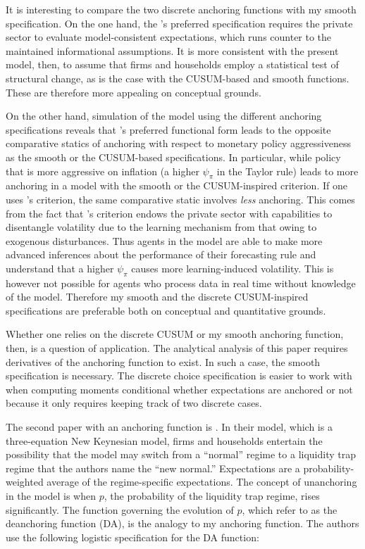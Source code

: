 \documentclass[11pt]{article}
\renewcommand{\[}{\begin{equation}}
\renewcommand{\]}{\end{equation}}
\begin{document}
It is interesting to compare the two discrete anchoring functions with my smooth specification. On the one hand, the \cite{carvalho2019anchored}'s preferred specification requires the private sector to evaluate model-consistent expectations, which runs counter to the maintained informational assumptions. It is more consistent with the present model, then, to assume that firms and households employ a statistical test of structural change, as is the case with the CUSUM-based and smooth functions. These are therefore more appealing on conceptual grounds.

On the other hand, simulation of the model using the different anchoring specifications reveals that \cite{carvalho2019anchored}'s preferred functional form leads to the opposite comparative statics of anchoring with respect to monetary policy aggressiveness as the smooth or the CUSUM-based specifications. In particular, while policy that is more aggressive on inflation (a higher $\psi_{\pi}$ in the Taylor rule) leads to more anchoring in a model with the smooth or the CUSUM-inspired criterion. If one uses \cite{carvalho2019anchored}'s criterion, the same comparative static involves \emph{less} anchoring. This comes from the fact that \cite{carvalho2019anchored}'s criterion endows the private sector with capabilities to disentangle volatility due to the learning mechanism from that owing to exogenous disturbances. Thus agents in the \cite{carvalho2019anchored} model are able to make more advanced inferences about the performance of their forecasting rule and understand that a higher $\psi_{\pi}$ causes more learning-induced volatility. This is however not possible for agents who process data in real time without knowledge of the model. Therefore my smooth and the discrete CUSUM-inspired specifications are preferable both on conceptual and quantitative grounds.

Whether one relies on the discrete CUSUM or my smooth anchoring function, then, is a question of application. The analytical analysis of this paper requires derivatives of the anchoring function to exist. In such a case, the smooth specification is necessary. The discrete choice specification is easier to work with when computing moments conditional whether expectations are anchored or not because it only requires keeping track of two discrete cases.

The second paper with an anchoring function is \cite{gobbi2019monetary}. In their model, which is a three-equation New Keynesian model, firms and households entertain the possibility that the model may switch from a ``normal'' regime to a liquidity trap regime that the authors name the ``new normal.'' Expectations are a probability-weighted average of the regime-specific expectations. The concept of unanchoring in the model is when $p$, the probability of the liquidity trap regime, rises significantly. The function governing the evolution of $p$, which \cite{gobbi2019monetary} refer to as the deanchoring function (DA), is the analogy to my anchoring function. The authors use the following logistic specification for the DA function:
\end{document}
